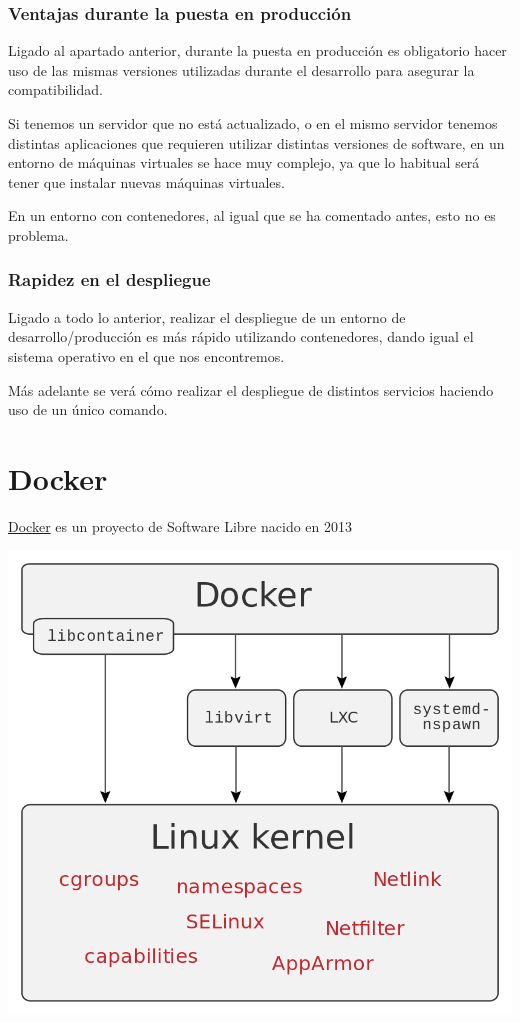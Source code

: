 \subsection{Ventajas durante la puesta en producción}
Ligado al apartado anterior, durante la puesta en producción es obligatorio hacer uso de las mismas versiones utilizadas durante el desarrollo para asegurar la compatibilidad.


Si tenemos un servidor que no está actualizado, o en el mismo servidor tenemos distintas aplicaciones que requieren utilizar distintas versiones de software, en un entorno de máquinas virtuales se hace muy complejo, ya que lo habitual será tener que instalar nuevas máquinas virtuales.


En un entorno con contenedores, al igual que se ha comentado antes, esto no es problema.

\subsection{Rapidez en el despliegue}

Ligado a todo lo anterior, realizar el despliegue de un entorno de desarrollo/producción es más rápido utilizando contenedores, dando igual el sistema operativo en el que nos encontremos.


Más adelante se verá cómo realizar el despliegue de distintos servicios haciendo uso de un único comando.


\chapter{Docker}

\href{https://www.docker.com/}{Docker} es un proyecto de Software Libre nacido en 2013

\begin{center}
    \includegraphics[width=0.6\linewidth]{img/docker/docker_interfaces.png}
\end{center}


